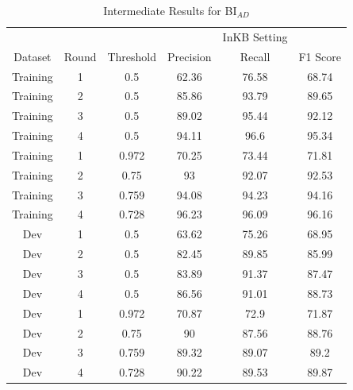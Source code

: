 \documentclass{report}
\theoremstyle{definition}
\theoremstyle{remark}
\begin{document}
\begin{table}[H]
    \vspace{0.5cm}\begin{tabular}{cccccc}
    &&&&InKB Setting & \\
    Dataset & Round    & Threshold& Precision & Recall & F1 Score \\
        \hline
    Training & 1 & 0.5&62.36&76.58&68.74 \\
    Training & 2 & 0.5&85.86&93.79&89.65 \\
    Training & 3 & 0.5&89.02&95.44&92.12 \\
    Training & 4 & 0.5&94.11&96.6&95.34 \\
    \hline
    Training & 1 & 0.972&70.25&73.44&71.81 \\
    Training & 2 & 0.75 &93&92.07&92.53\\
    Training & 3 & 0.759&94.08&94.23&94.16 \\
    Training & 4 & 0.728&96.23&96.09&96.16 \\
    \hline
    Dev & 1 & 0.5&63.62&75.26&68.95\\
    Dev & 2 & 0.5&82.45&89.85&85.99\\
    Dev & 3 & 0.5&83.89&91.37&87.47\\
    Dev & 4 & 0.5&86.56&91.01&88.73\\
    \hline
    Dev & 1 & 0.972&70.87&72.9&71.87 \\
    Dev & 2 & 0.75 &90&87.56&88.76 \\
    Dev & 3 & 0.759&89.32&89.07&89.2 \\
    Dev & 4 & 0.728&90.22&89.53&89.87 \\
    \end{tabular}
    \caption{Intermediate Results for BI$_{AD}$}
    \label{tab:biencoderadaptresapp}
\end{table}
\end{document}
